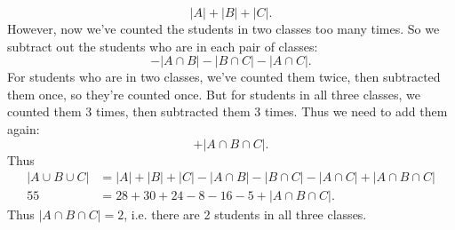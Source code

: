 \[
|A|+|B|+|C|.
\]
However, now we've counted the students in two classes too many times. So we subtract out the students who are in each pair of classes:
\[
-|A\cap B|-|B\cap C|-|A\cap C|.
\]
For students who are in two classes, we've counted them twice, then subtracted them once, so they're counted once. But for students in all three classes, we counted them 3 times, then subtracted them 3 times. Thus we need to add them again:
\[
+|A\cap B\cap C|.
\]
Thus
\begin{align*}
|A\cup B\cup C|&=|A|+|B|+|C|-|A\cap B|-|B\cap C|-|A\cap C|+|A\cap B\cap C|\\
55&=28+30+24-8-16-5+|A\cap B\cap C|.
\end{align*}
Thus $|A\cap B\cap C|=2$, i.e. there are 2 students in all three classes.\\

